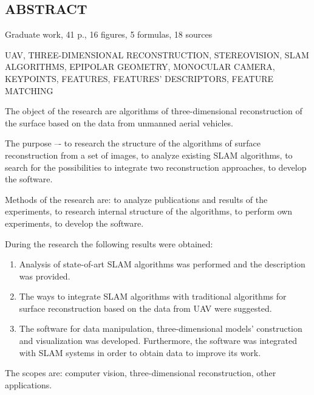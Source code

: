 \begin{titlepage}
    \begin{center}
        \section*{ABSTRACT}
    \end{center}

    \vspace{10mm}

    Graduate work, 41 p., 16 figures, 5 formulas, 18 sources

    \vspace{4mm}

    UAV, THREE-DIMENSIONAL RECONSTRUCTION, STEREOVISION, SLAM ALGORITHMS,
    EPIPOLAR GEOMETRY, MONOCULAR CAMERA, KEYPOINTS, FEATURES, FEATURES’ DESCRIPTORS,
    FEATURE MATCHING

    \vspace{4mm}

    The object of the research are algorithms of three-dimensional reconstruction
    of the surface based on the data from unmanned aerial vehicles.

    \vspace{4mm}

    The purpose –- to research the structure of the algorithms of surface reconstruction
    from a set of images, to analyze existing SLAM algorithms,
    to search for the possibilities to integrate two reconstruction approaches, to develop the software.

    \vspace{4mm}

    Methods of the research are: to analyze publications and results of the experiments,
    to research internal structure of the algorithms, to perform own experiments, to develop the software.

    \vspace{4mm}

    During the research the following results were obtained:

    \vspace{4mm}

    \begin{enumerate}
        \item Analysis of state-of-art SLAM algorithms was performed and the description was provided.
        \item The ways to integrate SLAM algorithms with traditional algorithms
        for surface reconstruction based on the data from UAV were suggested.
        \item The software for data manipulation, three-dimensional models’
        construction and visualization was developed. Furthermore, the software was
        integrated with SLAM systems in order to obtain data to improve its work.
    \end{enumerate}

    \vspace{4mm}

    The scopes are: computer vision, three-dimensional reconstruction, other applications.
\end{titlepage}

\newpage
